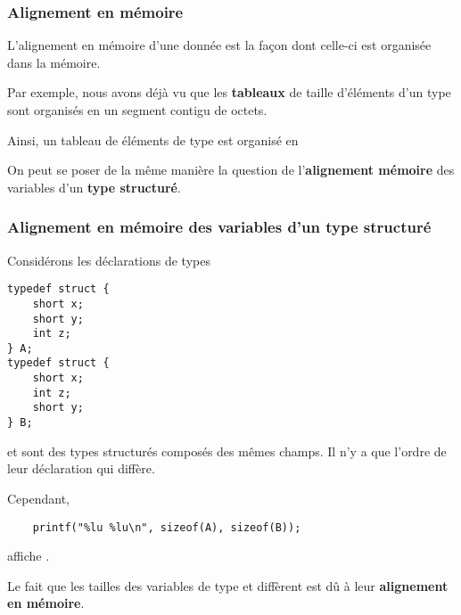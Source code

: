 \begin{frame}[fragile]
\frametitle{Alignement en mémoire}
L'\alert{alignement en mémoire} d'une donnée est la façon dont celle-ci
est organisée dans la mémoire.
\bigskip

Par exemple, nous avons déjà vu que les {\bf tableaux} de taille
 d'éléments d'un type  sont organisés en un segment
contigu de  octets.
\medskip

Ainsi, un tableau  de  éléments de type 
est organisé en
\begin{center}
\end{center}
\bigskip

On peut se poser de la même manière la question de l'{\bf alignement
mémoire} des variables d'un {\bf type structuré}.
\end{frame}

\begin{frame}[fragile]
\frametitle{Alignement en mémoire des variables d'un type structuré}
Considérons les déclarations de types
\begin{multicols}{2}
\begin{lstlisting}
typedef struct {
    short x;
    short y;
    int z;
} A;
typedef struct {
    short x;
    int z;
    short y;
} B;
\end{lstlisting}
\end{multicols}
\medskip

 et  sont des types structurés composés des mêmes champs.
Il n'y a que l'ordre de leur déclaration qui diffère.
\medskip

Cependant,
\begin{lstlisting}
    printf("%lu %lu\n", sizeof(A), sizeof(B));
\end{lstlisting}
affiche .
\medskip

Le fait que les tailles des variables de type  et 
diffèrent est dû à leur {\bf alignement en mémoire}.
\end{frame}

